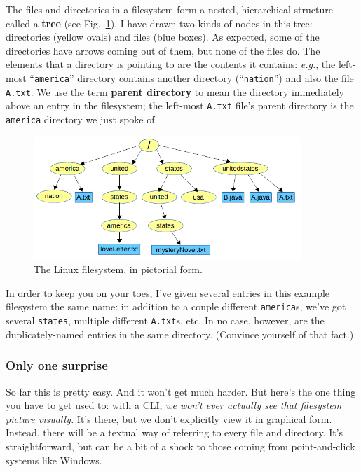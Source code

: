 The files and directories in a filesystem form a nested, hierarchical
structure called a \textbf{tree} (see Fig.~\ref{fig:tree}). I have drawn two
kinds of nodes in this tree: directories (yellow ovals) and files (blue
boxes). As expected, some of the directories have arrows coming out of them,
but none of the files do. The elements that a directory is pointing to are the
contents it contains: \textit{e.g.}, the left-most ``\texttt{america}''
directory contains another directory (``\texttt{nation}'') and also the file
\texttt{A.txt}. We use the term \textbf{parent directory} to mean the
directory immediately above an entry in the filesystem; the left-most
\texttt{A.txt} file's parent directory is the \texttt{america} directory we
just spoke of.

\begin{figure}[ht]
\centering
\includegraphics[width=0.9\textwidth]{tree.png}  %
\caption{The Linux filesystem, in pictorial form.}
\label{fig:tree}
\end{figure}

In order to keep you on your toes, I've given several entries in this example
filesystem the same name: in addition to a couple different \texttt{america}s,
we've got several \texttt{states}, multiple different \texttt{A.txt}s, etc. In
no case, however, are the duplicately-named entries in the same directory.
(Convince yourself of that fact.)

\subsubsection{Only one surprise}

So far this is pretty easy. And it won't get much harder. But here's the one
thing you have to get used to: with a CLI, \textit{we won't ever actually see
that filesystem picture visually.} It's there, but we don't explicitly view it
in graphical form. Instead, there will be a textual way of referring to every
file and directory. It's straightforward, but can be a bit of a shock to those
coming from point-and-click systems like Windows.

